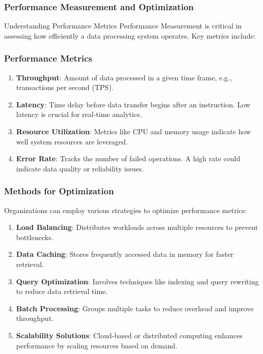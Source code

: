\documentclass[aspectratio=169]{beamer}
\begin{document}
\begin{frame}[fragile]
    \frametitle{Performance Measurement and Optimization}
    \begin{block}{Understanding Performance Metrics}
        Performance Measurement is critical in assessing how efficiently a data processing system operates. Key metrics include:
    \end{block}
\end{frame}

\begin{frame}[fragile]
    \frametitle{Performance Metrics}
    \begin{enumerate}
        \item \textbf{Throughput}: Amount of data processed in a given time frame, e.g., transactions per second (TPS).
        \item \textbf{Latency}: Time delay before data transfer begins after an instruction. Low latency is crucial for real-time analytics.
        \item \textbf{Resource Utilization}: Metrics like CPU and memory usage indicate how well system resources are leveraged.
        \item \textbf{Error Rate}: Tracks the number of failed operations. A high rate could indicate data quality or reliability issues.
    \end{enumerate}
\end{frame}

\begin{frame}[fragile]
    \frametitle{Methods for Optimization}
    Organizations can employ various strategies to optimize performance metrics:
    \begin{enumerate}
        \item \textbf{Load Balancing}: Distributes workloads across multiple resources to prevent bottlenecks.
        \item \textbf{Data Caching}: Stores frequently accessed data in memory for faster retrieval.
        \item \textbf{Query Optimization}: Involves techniques like indexing and query rewriting to reduce data retrieval time.
        \item \textbf{Batch Processing}: Groups multiple tasks to reduce overhead and improve throughput.
        \item \textbf{Scalability Solutions}: Cloud-based or distributed computing enhances performance by scaling resources based on demand.
    \end{enumerate}
\end{frame}
\end{document}
